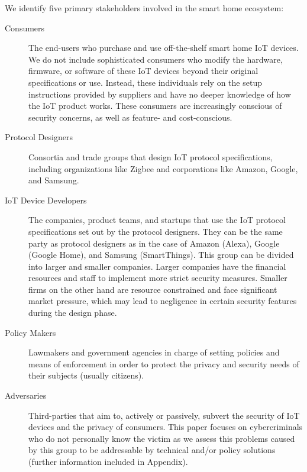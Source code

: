 We identify five primary stakeholders involved in the smart home ecosystem:
\begin{description}
\item[Consumers] The end-users who purchase and use off-the-shelf smart home IoT devices. We do not include sophisticated consumers who modify the hardware, firmware, or software of these IoT devices beyond their original specifications or use. Instead, these individuals rely on the setup instructions provided by suppliers and have no deeper knowledge of how the IoT product works. These consumers are increasingly conscious of security concerns, as well as feature- and cost-conscious.
\item[Protocol Designers] Consortia and trade groups that design IoT protocol specifications, including organizations like Zigbee and corporations like Amazon, Google, and Samsung.
\item[IoT Device Developers] The companies, product teams, and startups that use the IoT protocol specifications set out by the protocol designers. They can be the same party as protocol designers as in the case of Amazon (Alexa), Google (Google Home), and Samsung (SmartThings). This group can be divided into larger and smaller companies. Larger companies have the financial resources and staff to implement more strict security measures. Smaller firms on the other hand are resource constrained and face significant market pressure, which may lead to negligence in certain security features during the design phase. 
\item[Policy Makers] Lawmakers and government agencies in charge of setting policies and means of enforcement in order to protect the privacy and security needs of their subjects (usually citizens).
\item[Adversaries] Third-parties that aim to, actively or passively, subvert the security of IoT devices and the privacy of consumers. This paper focuses on cybercriminals who do not personally know the victim as we assess this problems caused by this group to be addressable by technical and/or policy solutions (further information included in Appendix).
\end{description}

